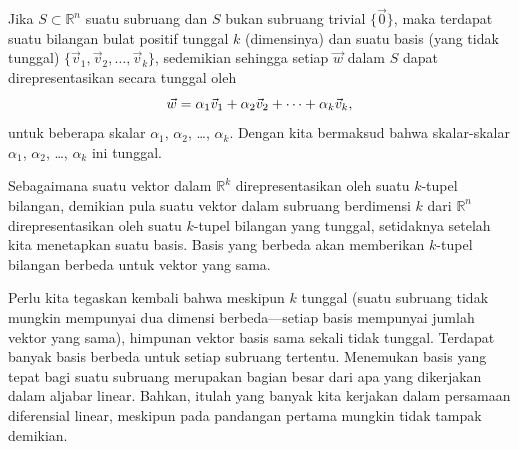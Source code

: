 \begin{theorem}
\pagebreak[2]
Jika $S \subset {\mathbb R}^n$ suatu subruang dan $S$ bukan subruang
trivial $\{ \vec{0} \}$, maka terdapat suatu bilangan bulat positif tunggal
$k$ (dimensinya) dan suatu basis (yang tidak tunggal)
$\{ \vec{v}_1, \vec{v}_2, \ldots, \vec{v}_k \}$, sedemikian sehingga setiap
$\vec{w}$ dalam $S$ dapat direpresentasikan secara tunggal oleh
\begin{equation*}
\vec{w} =
\alpha_1 \vec{v}_1 +
\alpha_2 \vec{v}_2 +
\cdots
+
\alpha_k \vec{v}_k ,
\avoidbreak
\end{equation*}
untuk beberapa skalar $\alpha_1$, $\alpha_2$, \ldots, $\alpha_k$.
Dengan  kita bermaksud bahwa
skalar-skalar $\alpha_1$, $\alpha_2$, \ldots, $\alpha_k$ ini tunggal.
\end{theorem}

Sebagaimana suatu vektor dalam ${\mathbb R}^k$ direpresentasikan oleh suatu $k$-tupel
bilangan, demikian pula suatu vektor dalam subruang berdimensi $k$ dari ${\mathbb R}^n$
direpresentasikan oleh suatu $k$-tupel bilangan yang tunggal, setidaknya setelah kita menetapkan suatu basis.
Basis yang berbeda akan memberikan $k$-tupel bilangan berbeda untuk vektor yang sama.

Perlu kita tegaskan kembali bahwa meskipun $k$ tunggal
(suatu subruang tidak mungkin mempunyai dua dimensi berbeda---setiap
basis mempunyai jumlah vektor yang sama),
himpunan vektor basis sama sekali tidak tunggal. Terdapat banyak
basis berbeda untuk setiap subruang tertentu. Menemukan basis yang tepat bagi
suatu subruang merupakan bagian besar dari apa yang dikerjakan dalam aljabar linear. Bahkan,
itulah yang banyak kita kerjakan dalam
persamaan diferensial linear, meskipun pada pandangan pertama
mungkin tidak tampak demikian.

